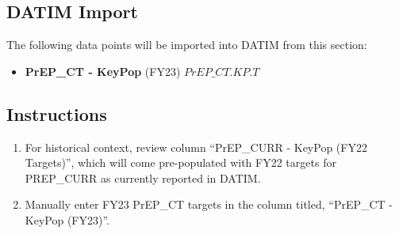 \documentclass[
  openany]{book}
\providecommand{\tightlist}{%
  \setlength{\itemsep}{0pt}\setlength{\parskip}{0pt}}
\begin{document}
\begin{table}
\centering\begingroup\fontsize{12}{14}\selectfont

\endgroup{}
\end{table}

\hypertarget{datim-import-33}{%
\subsection{DATIM Import}\label{datim-import-33}}

The following data points will be imported into DATIM from this section:

\begin{itemize}
\tightlist
\item
  \textbf{PrEP\_CT - KeyPop} (FY23) \(PrEP\_CT.KP.T\)
\end{itemize}

\hypertarget{instructions-33}{%
\subsection{Instructions}\label{instructions-33}}

\begin{enumerate}
\def\labelenumi{\arabic{enumi}.}
\item
  For historical context, review column ``PrEP\_CURR - KeyPop (FY22
  Targets)'', which will come pre-populated with FY22 targets for
  PREP\_CURR as currently reported in DATIM.
\item
  Manually enter FY23 PrEP\_CT targets in the column titled, ``PrEP\_CT -
  KeyPop (FY23)''.
\end{enumerate}
\end{document}
